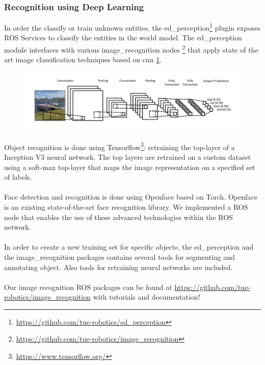 \subsubsection{Recognition using Deep Learning}
In order the classify or train unknown entities, the ed\_perception\footnote{\url{https://github.com/tue-robotics/ed_perception}} plugin exposes ROS Services to classify the entities in the world model. The ed\_perception module interfaces with various image\_recognition nodes \footnote{\url{https://github.com/tue-robotics/image_recognition}} that apply state of the art image classification techniques based on \acrfull{cnn} \ref{fig:cnn}.
\begin{figure}[ht]
	\includegraphics[width = \linewidth]{Figures/cnn}
	\label{fig:cnn}
\end{figure}
Object recognition is done using Tensorflow\footnote{\url{https://www.tensorflow.org/}}: retraining the top-layer of a Inception V3 neural network. The top layers are retrained on a custom dataset using a soft-max top-layer that maps the image representation on a specified set of labels. 
\\\\
Face detection and recognition is done using Openface based on Torch. Openface is an existing state-of-the-art face recognition library. We implemented a ROS node that enables the use of these advanced technologies within the ROS network.
\\\\
In order to create a new training set for specific objects, the ed\_perception and the image\_recognition packages contains several tools for segmenting and annotating object. Also tools for retraining neural networks are included. 
\\\\
Our image recognition ROS packages can be found at \url{https://github.com/tue-robotics/image_recognition} with tutorials and documentation!